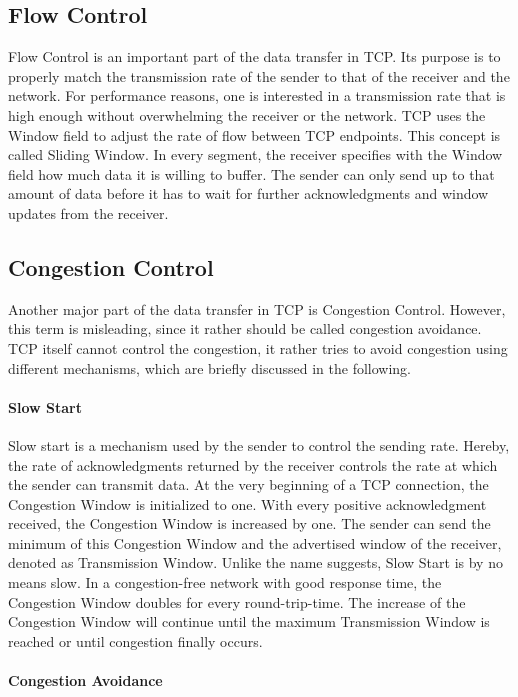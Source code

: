 \subsection*{Flow Control}

Flow Control is an important part of the data transfer in TCP. Its purpose is to properly match the transmission rate of the sender to that of the receiver and the network. For performance reasons, one is interested in a transmission rate that is high enough without overwhelming the receiver or the network. TCP uses the Window field to adjust the rate of flow between TCP endpoints. This concept is called Sliding Window. In every segment, the receiver specifies with the Window field how much data it is willing to buffer. The sender can only send up to that amount of data before it has to wait for further acknowledgments and window updates from the receiver. 

\subsection*{Congestion Control}

Another major part of the data transfer in TCP is Congestion Control. However, this term is misleading, since it rather should be called congestion avoidance. TCP itself cannot control the congestion, it rather tries to avoid congestion using different mechanisms, which are briefly discussed in the following. 

\paragraph{Slow Start}

Slow start is a mechanism used by the sender to control the sending rate. Hereby, the rate of acknowledgments returned by the receiver controls the rate at which the sender can transmit data. At the very beginning of a TCP connection, the Congestion Window is initialized to one. With every positive acknowledgment received, the Congestion Window is increased by one. The sender can send the minimum of this Congestion Window and the advertised window of the receiver, denoted as Transmission Window. Unlike the name suggests, Slow Start is by no means slow. In a congestion-free network with good response time, the Congestion Window doubles for every round-trip-time. The increase of the Congestion Window will continue until the maximum Transmission Window is reached or until congestion finally occurs.

\paragraph{Congestion Avoidance}

